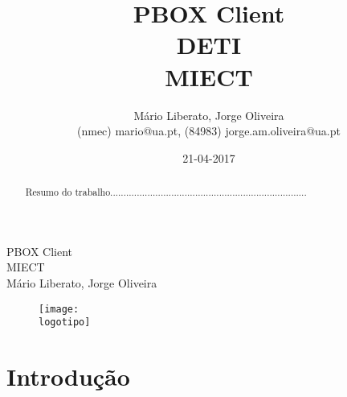 \documentclass{report}
\begin{document}
%
%
\def\titulo{PBOX Client}
\def\data{21-04-2017}
\def\autores{Mário Liberato, Jorge Oliveira}
\def\autorescontactos{(nmec) mario@ua.pt, (84983) jorge.am.oliveira@ua.pt}
\def\departamento{DETI}
\def\curso{MIECT}
\def\logotipo{ua.pdf}
%
%
\begin{titlepage}

\begin{center}
%
\vspace*{50mm}
%
{\Huge \titulo}\\ 
%
\vspace{10mm}
%
{\Large \curso}\\
%
\vspace{10mm}
%
{\LARGE \autores}\\ 
%
\vspace{30mm}
%
\begin{figure}[h]
\center
\texttt{[image: \\logotipo]}
\end{figure}
%
\vspace{30mm}
\end{center}
%
\end{titlepage}

\title{%
{\Huge\textbf{\titulo}}\\
{\Large \departamento\\ \curso}
}
%
\author{%
    \autores \\
    \autorescontactos
}
%
\date{\data}
%
\maketitle


\begin{abstract}
Resumo do trabalho..........................................................................
\end{abstract}


\tableofcontents


%
\clearpage
{} %
%
\chapter{Introdução}
\label{chap.introducao} %
\end{document}
